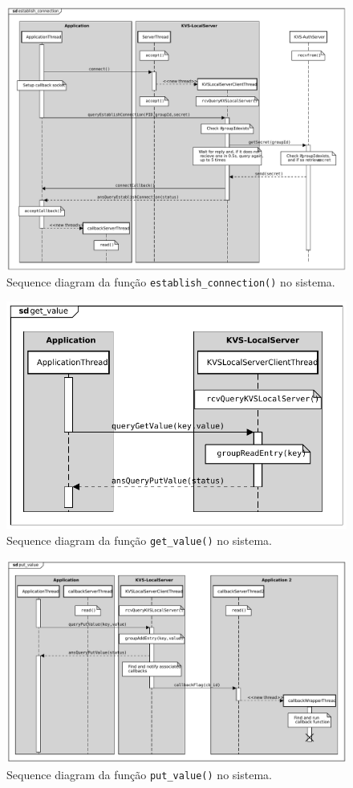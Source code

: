 \begin{figure}[H]
    \centering
    \includegraphics[width=\linewidth]{figures/UML/establish_connection.pdf}
    \caption{Sequence diagram da função \texttt{establish\_connection()} no sistema.}
    \label{fig:sd_establish_connection}
\end{figure}

\begin{figure}[H]
    \centering
    \includegraphics[width=0.7\linewidth]{figures/UML/get_value.pdf}
    \caption{Sequence diagram da função \texttt{get\_value()} no sistema.}
    \label{fig:sd_get_value}
\end{figure}

\begin{figure}[H]
    \centering
    \includegraphics[width=\linewidth]{figures/UML/put_value.pdf}
    \caption{Sequence diagram da função \texttt{put\_value()} no sistema.}
    \label{fig:sd_put_value}
\end{figure}

